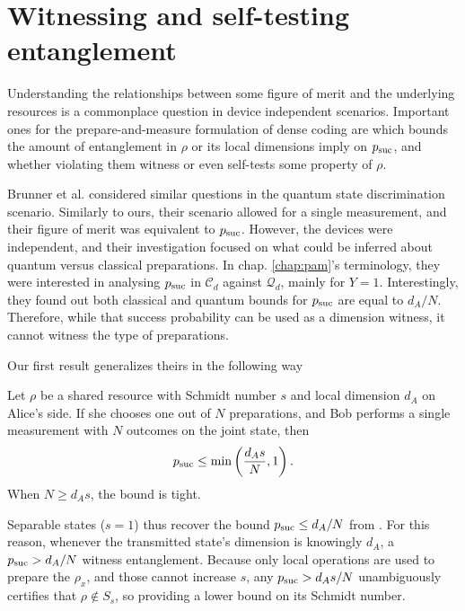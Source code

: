     \section{Witnessing and self-testing entanglement}

        Understanding the relationships between some figure of merit and the underlying resources is a commonplace question in device independent scenarios. Important ones for the prepare-and-measure formulation of dense coding are which bounds the amount of entanglement in $\rho$ or its local dimensions imply on $p_{\text{suc}}$, and whether violating them witness or even self-tests some property of $\rho$. 
    
        Brunner et al. \cite{brunner_dimension_2013} considered similar questions in the quantum state discrimination scenario. Similarly to ours, their scenario allowed for a single measurement, and their figure of merit was equivalent to $p_{\text{suc}}$. However, the devices were independent, and their investigation focused on what could be inferred about quantum versus classical preparations. In chap. \ref{chap:pam}'s terminology, they were interested in analysing $p_{\text{suc}}$ in $\mathcal{C}_d$ against $\mathcal{Q}_d$, mainly for $Y=1$. Interestingly, they found out both classical and quantum bounds for $p_{\text{suc}}$ are equal to $d_A / N$. Therefore, while that success probability can be used as a dimension witness, it cannot witness the type of preparations.
        
        Our first result generalizes theirs in the following way
        \begin{result}
            Let $\rho$ be a shared resource with Schmidt number $s$ and local dimension $d_A$ on Alice's side. If she chooses one out of $N$ preparations, and Bob performs a single measurement with $N$ outcomes on the joint state, then
            \begin{equation}
                p_{\text{suc}} \leq \min \left( \frac{d_A s}{N}, 1 \right) .
                \label{eq:result-1}
            \end{equation}
            When $N \geq d_A s$, the bound is tight.
            \label{res:1}
        \end{result}
        Separable states ($s=1$) thus recover the bound $p_{\text{suc}} \leq d_A / N$ from \cite{brunner_dimension_2013}. For this reason, whenever the transmitted state's dimension is knowingly $d_A$, a $p_{\text{suc}} > d_A / N$ witness entanglement. Because only local operations are used to prepare the $\rho_x$, and those cannot increase $s$, any $p_{\text{suc}} > d_A s / N$ unambiguously certifies that $\rho \notin S_s$, so providing a lower bound on its Schmidt number.
        
